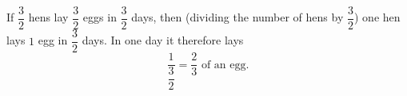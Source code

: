 If $\dfrac32$ hens lay $\dfrac32$ eggs in $\dfrac32$ days, then (dividing the number of hens by $\dfrac32$) one hen lays $1$ egg in $\dfrac32$ days. In one day it therefore lays
\[\dfrac{1}{\dfrac32}=\boxed{\dfrac23}\text{ of an egg}.\]
